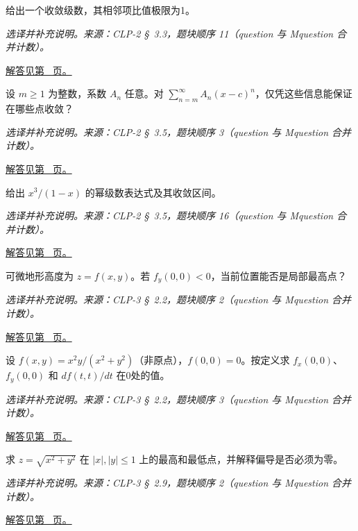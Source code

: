 \documentclass[12pt,fontset=fandol]{ctexart}
\begin{document}
\begin{example}[比值判别无结论的收敛例子]\label{ex:c45q12}
给出一个收敛级数，其相邻项比值极限为1。
\par\textit{选译并补充说明。来源：CLP-2 \S~3.3，题块顺序 11（question 与 Mquestion 合并计数）。}\par\hyperref[ans:c45q12]{解答见第~\pageref{ans:c45q12} 页。}
\end{example}
\begin{example}[幂级数一定收敛的点]\label{ex:c45q13}
设 $m\ge1$ 为整数，系数 $A_n$ 任意。对 $\sum_{n=m}^\infty A_n(x-c)^n$，仅凭这些信息能保证在哪些点收敛？
\par\textit{选译并补充说明。来源：CLP-2 \S~3.5，题块顺序 3（question 与 Mquestion 合并计数）。}\par\hyperref[ans:c45q13]{解答见第~\pageref{ans:c45q13} 页。}
\end{example}
\begin{example}[几何级数乘幂]\label{ex:c45q14}
给出 $x^3/(1-x)$ 的幂级数表达式及其收敛区间。
\par\textit{选译并补充说明。来源：CLP-2 \S~3.5，题块顺序 16（question 与 Mquestion 合并计数）。}\par\hyperref[ans:c45q14]{解答见第~\pageref{ans:c45q14} 页。}
\end{example}
\begin{example}[非零偏导与山顶]\label{ex:c45q15}
可微地形高度为 $z=f(x,y)$。若 $f_y(0,0)<0$，当前位置能否是局部最高点？
\par\textit{选译并补充说明。来源：CLP-3 \S~2.2，题块顺序 2（question 与 Mquestion 合并计数）。}\par\hyperref[ans:c45q15]{解答见第~\pageref{ans:c45q15} 页。}
\end{example}
\begin{example}[偏导数不能冒充全方向链式法则]\label{ex:c45q16}
设 $f(x,y)=x^2y/(x^2+y^2)$（非原点），$f(0,0)=0$。按定义求 $f_x(0,0)$、$f_y(0,0)$ 和 $d f(t,t)/dt$ 在0处的值。
\par\textit{选译并补充说明。来源：CLP-3 \S~2.2，题块顺序 3（question 与 Mquestion 合并计数）。}\par\hyperref[ans:c45q16]{解答见第~\pageref{ans:c45q16} 页。}
\end{example}
\begin{example}[圆锥面在正方形上的最值]\label{ex:c45q17}
求 $z=\sqrt{x^2+y^2}$ 在 $|x|,|y|\le1$ 上的最高和最低点，并解释偏导是否必须为零。
\par\textit{选译并补充说明。来源：CLP-3 \S~2.9，题块顺序 2（question 与 Mquestion 合并计数）。}\par\hyperref[ans:c45q17]{解答见第~\pageref{ans:c45q17} 页。}
\end{example}
\end{document}
